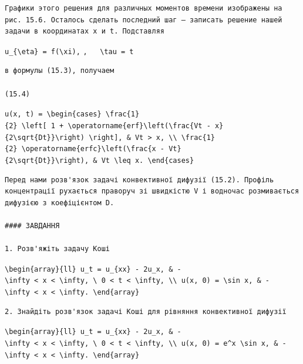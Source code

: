 \documentclass[
  ukrainian,
]{article}
\begin{document}
\begin{verbatim}
Графики этого решения для различных моментов времени изображены на рис. 15.6. Осталось сделать последний шаг — записать решение нашей задачи в координатах x и t. Подставляя
\end{verbatim}

\texttt{u\_\{\textbackslash{}eta\}\ =\ f(\textbackslash{}xi),}
\texttt{,\ \ \ \textbackslash{}tau\ =\ t}

\begin{verbatim}
в формулы (15.3), получаем

(15.4)
\end{verbatim}

\texttt{u(x,\ t)\ =\ \textbackslash{}begin\{cases\}\ \textbackslash{}frac\{1\}\{2\}\ \textbackslash{}left{[}\ 1\ +\ \textbackslash{}operatorname\{erf\}\textbackslash{}left(\textbackslash{}frac\{Vt\ -\ x\}\{2\textbackslash{}sqrt\{Dt\}\}\textbackslash{}right)\ \textbackslash{}right{]},\ \&\ Vt\ \textgreater{}\ x,\ \textbackslash{}\textbackslash{}\ \textbackslash{}frac\{1\}\{2\}\ \textbackslash{}operatorname\{erfc\}\textbackslash{}left(\textbackslash{}frac\{x\ -\ Vt\}\{2\textbackslash{}sqrt\{Dt\}\}\textbackslash{}right),\ \&\ Vt\ \textbackslash{}leq\ x.\ \textbackslash{}end\{cases\}}

\begin{verbatim}
Перед нами розв'язок задачі конвективної дифузії (15.2). Профіль концентрації рухається праворуч зі швидкістю V і водночас розмивається дифузією з коефіцієнтом D.

#### ЗАВДАННЯ

1. Розв'яжіть задачу Коші
\end{verbatim}

\texttt{\textbackslash{}begin\{array\}\{ll\}\ u\_t\ =\ u\_\{xx\}\ -\ 2u\_x,\ \&\ -\textbackslash{}infty\ \textless{}\ x\ \textless{}\ \textbackslash{}infty,\ \textbackslash{}\ 0\ \textless{}\ t\ \textless{}\ \textbackslash{}infty,\ \textbackslash{}\textbackslash{}\ u(x,\ 0)\ =\ \textbackslash{}sin\ x,\ \&\ -\textbackslash{}infty\ \textless{}\ x\ \textless{}\ \textbackslash{}infty.\ \textbackslash{}end\{array\}}

\begin{verbatim}
2. Знайдіть розв'язок задачі Коші для рівняння конвективної дифузії
\end{verbatim}

\texttt{\textbackslash{}begin\{array\}\{ll\}\ u\_t\ =\ u\_\{xx\}\ -\ 2u\_x,\ \&\ -\textbackslash{}infty\ \textless{}\ x\ \textless{}\ \textbackslash{}infty,\ \textbackslash{}\ 0\ \textless{}\ t\ \textless{}\ \textbackslash{}infty,\ \textbackslash{}\textbackslash{}\ u(x,\ 0)\ =\ e\^{}x\ \textbackslash{}sin\ x,\ \&\ -\textbackslash{}infty\ \textless{}\ x\ \textless{}\ \textbackslash{}infty.\ \textbackslash{}end\{array\}}
\end{document}
